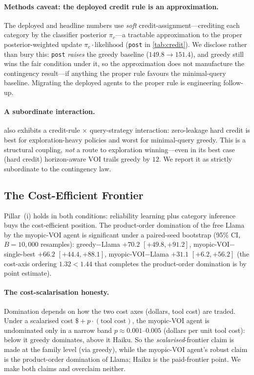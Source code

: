 \documentclass[11pt]{article}
\begin{document}
\paragraph{Methods caveat: the deployed credit rule is an approximation.} The deployed and headline numbers use \emph{soft} credit-assignment---crediting each category by the classifier posterior $\pi_c$---a tractable approximation to the proper posterior-weighted update $\pi_c \cdot \text{likelihood}$ (\texttt{post} in \cref{tab:credit}). We disclose rather than bury this: \texttt{post} \emph{raises} the greedy baseline ($149.8 \to 151.4$), and greedy still wins the fair condition under it, so the approximation does not manufacture the contingency result---if anything the proper rule favours the minimal-query baseline. Migrating the deployed agents to the proper rule is engineering follow-up.

\paragraph{A subordinate interaction.}  also exhibits a credit-rule $\times$ query-strategy interaction: zero-leakage hard credit is best for exploration-heavy policies and worst for minimal-query greedy. This is a structural coupling, \emph{not} a route to exploration winning---even in its best case (hard credit) horizon-aware VOI trails greedy by $12$. We report it as strictly subordinate to the contingency law.

\subsection{The Cost-Efficient Frontier}
\label{sec:frontier}

Pillar~(i) holds in both conditions: reliability learning plus category inference buys the cost-efficient position. The product-order domination of the free Llama by the myopic-VOI agent is significant under a paired-seed bootstrap (95\% CI, $B = 10{,}000$ resamples): greedy${-}$Llama $+70.2$ $[+49.8, +91.2]$, myopic-VOI${-}$single-best $+66.2$ $[+44.4, +88.1]$, myopic-VOI${-}$Llama $+31.1$ $[+6.2, +56.2]$ (the cost-axis ordering $1.32 < 1.44$ that completes the product-order domination is by point estimate).

\paragraph{The cost-scalarisation honesty.} Domination depends on how the two cost axes (dollars, tool cost) are traded. Under a scalarised cost $\text{\$} + p \cdot (\text{tool cost})$, the myopic-VOI agent is undominated only in a narrow band $p \approx 0.001$--$0.005$ (dollars per unit tool cost): below it greedy dominates, above it Haiku. So the \emph{scalarised}-frontier claim is made at the family level (via greedy), while the myopic-VOI agent's robust claim is the product-order domination of Llama; Haiku is the paid-frontier point. We make both claims and overclaim neither.
\end{document}
